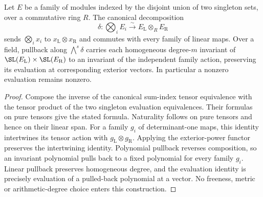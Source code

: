 \begin{lemma}
\label{lem:two-factor-plucker-transport}
\leanok
Let $E$ be a family of modules indexed by the disjoint union of two singleton
sets, over a commutative ring $R$. The canonical decomposition
\[
 \delta:\bigotimes_i E_i\xrightarrow{\sim} E_{\mathrm L}\otimes_R E_{\mathrm R}
\]
sends $\bigotimes_i x_i$ to $x_{\mathrm L}\otimes x_{\mathrm R}$ and commutes
with every family of linear maps. Over a field, pullback along
$\bigwedge^s\delta$ carries each homogeneous degree-$m$ invariant of
$\SL(E_{\mathrm L})\times\SL(E_{\mathrm R})$ to an invariant of the independent
family action, preserving its evaluation at corresponding exterior vectors.
In particular a nonzero evaluation remains nonzero.
\end{lemma}
\begin{proof}
Compose the inverse of the canonical sum-index tensor equivalence with the
tensor product of the two singleton evaluation equivalences. Their formulas
on pure tensors give the stated formula. Naturality follows on pure tensors
and hence on their linear span. For a family $g_i$ of determinant-one
maps, this identity intertwines its tensor action with
$g_{\mathrm L}\otimes g_{\mathrm R}$. Applying the exterior-power functor
preserves the intertwining identity. Polynomial pullback reverses composition,
so an invariant polynomial pulls back to a fixed polynomial for every family
$g_i$. Linear pullback preserves homogeneous degree, and the evaluation
identity is precisely evaluation of a pulled-back polynomial at a vector.
No freeness, metric or arithmetic-degree choice enters this construction.
\end{proof}

